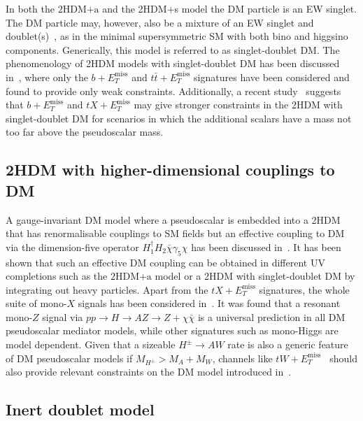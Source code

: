 \documentclass[review]{elsarticle}
\newcommand{\MET}{\ensuremath{E_T^\mathrm{miss}}\xspace}
\newcommand{\hdma}{\ensuremath{\textrm{2HDM+a}}\xspace}
\begin{document}
In both the \hdma and the 2HDM+s model the DM particle is  an EW singlet. The DM particle may, however, also be a mixture of an EW singlet and doublet(s)~\cite{Mahbubani:2005pt,Enberg:2007rp,Cohen:2011ec,Cheung:2013dua}, as in the minimal supersymmetric SM with both bino and higgsino components. Generically, this model is referred to as singlet-doublet DM. The phenomenology of 2HDM models with singlet-doublet DM has been discussed in~\cite{Berlin:2015wwa,Arcadi:2018pfo}, where only the $b+\MET$ and $t \bar t+\MET$ signatures have been considered and found to provide only weak constraints. Additionally, a recent study~\cite{Bauer:2017fsw} suggests that $b+\MET$ and $tX+\MET$ may give stronger constraints in the 2HDM with singlet-doublet DM for scenarios in which the additional scalars have a mass not too far above the pseudoscalar mass. 

\subsection{2HDM with  higher-dimensional couplings to DM}

A gauge-invariant DM model where a pseudoscalar is embedded into a 2HDM that has renormalisable couplings to SM fields but an effective coupling to DM via the dimension-five operator $H_1^\dagger H_2 \bar \chi \gamma_5 \chi$ has been  discussed in~\cite{Bauer:2017fsw}. It has been shown that  such an  effective DM coupling can be obtained in different UV completions such as the \hdma model or  a 2HDM with singlet-doublet DM by integrating out heavy particles. Apart from the $t X+\MET$ signatures, the whole suite of mono-$X$ signals has been considered in~\cite{Bauer:2017fsw}. It was found that a resonant mono-$Z$ signal via $pp \to H \to AZ \to  Z + \chi \bar \chi$ is a universal prediction in all DM pseudoscalar mediator models, while other signatures such as mono-Higgs are model dependent. Given that a sizeable $H^\pm \to A W$ rate is also a generic feature of DM pseudoscalar models if $M_{H^\pm} > M_A + M_W$, channels like $tW+\MET$~\cite{Pani:2017qyd} should also  provide relevant constraints on the DM model introduced in~\cite{Bauer:2017fsw}. 

\subsection{Inert doublet model}
\end{document}
